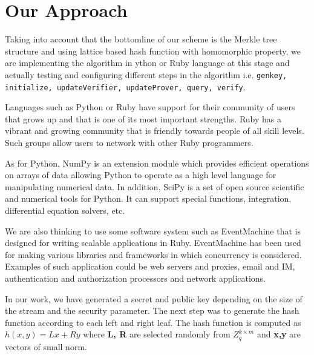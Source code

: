 \documentclass[11pt, letterpaper, oneside]{article}
\begin{document}
\section{Our Approach}

Taking into account that the bottomline of our scheme is the Merkle tree structure and using lattice based hash function with homomorphic property, we are implementing the algorithm in ython or Ruby language at this stage and actually testing and configuring different steps in the algorithm i.e. \texttt{genkey, initialize, updateVerifier, updateProver, query, verify}.

Languages such as Python or Ruby have support for their community of users that grows up and that
is one of its most important strengths.
Ruby has a vibrant and growing community that is friendly towards people of all skill levels.
Such groups allow users to network with other Ruby programmers.

As for Python, NumPy is an extension module which provides efficient operations on arrays of data allowing Python to operate as a high level language for manipulating numerical data.
In addition, SciPy is a set of open source scientific and numerical tools for Python.
It can support special functions, integration, differential equation solvers, etc.

We are also thinking to use some software system such as EventMachine that is designed for writing
scalable applications in Ruby.
EventMachine has been used for making various libraries and frameworks in which concurrency is considered.
Examples of such application could be web servers and proxies, email and IM, authentication and authorization processors and network applications.


In our work, we have generated a secret and public key depending on the size of the stream and the security parameter.
The next step was to generate the hash function according to each left and right leaf.
The hash function is computed as $ h(x,y) = Lx + Ry $ where \textbf{L, R} are selected randomly from $Z_{q}^{k \times m}$ and
\textbf{x,y} are vectors of small norm.




\end{document}
